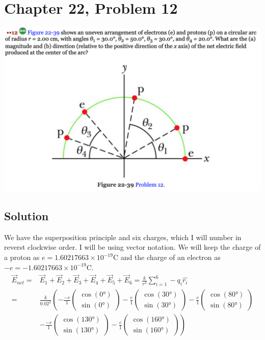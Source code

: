 \documentclass[12pt]{article}
\begin{document}
\section*{Chapter 22, Problem 12}
\includegraphics[width=\textwidth]{picture_6.png}

\subsection*{Solution}
We have the superposition principle and six charges, which I will number in reverst clockwise order. I will be using vector notation. We will keep the charge of a proton as $e = 1.60217663 \times 10^{-19} \unit{\coulomb}$ and the charge of an electron as $-e = -1.60217663 \times 10^{-19} \unit{\coulomb}$.
\begin{align*}
    \vec{E}_{net}   =&  \vec{E}_1 + \vec{E}_2 + \vec{E}_3 + \vec{E}_4 + \vec{E}_5 + \vec{E}_6
        =   \frac{k}{r^2}\sum_{i=1}^{6} - q_i \hat{r_i}\\
        =&  \frac{k}{0.02^2}\left(-\frac{-e}{1}\begin{pmatrix}\cos(0\unit{\degree})\\ \sin(0\unit{\degree})\end{pmatrix}
            - \frac{e}{1}\begin{pmatrix}\cos(30\unit{\degree})\\ \sin(30\unit{\degree})\end{pmatrix}
            - \frac{e}{1}\begin{pmatrix}\cos(80\unit{\degree})\\ \sin(80\unit{\degree})\end{pmatrix}\right. \\
            & \left. - \frac{-e}{1}\begin{pmatrix}\cos(130\unit{\degree})\\ \sin(130\unit{\degree})\end{pmatrix}
            - \frac{e}{1}\begin{pmatrix}\cos(160\unit{\degree})\\ \sin(160\unit{\degree})\end{pmatrix}\right)
\end{align*}
\end{document}
